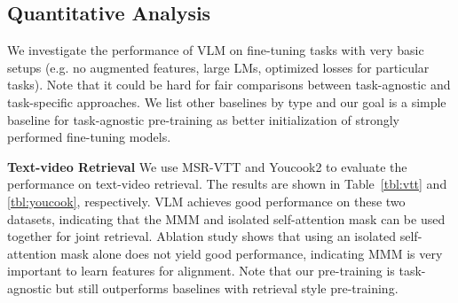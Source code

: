 \documentclass[11pt,a4paper]{article}
\begin{document}
\subsection{Quantitative Analysis}
We investigate the performance of VLM on fine-tuning tasks with very basic setups (e.g. no augmented features, large LMs, optimized losses for particular tasks).
Note that it could be hard for fair comparisons between task-agnostic and task-specific approaches. We list other baselines by type and our goal is a simple baseline for task-agnostic pre-training as better initialization of strongly performed fine-tuning models.

\noindent \textbf{Text-video Retrieval} We use MSR-VTT and Youcook2 to evaluate the performance on text-video retrieval.
The results are shown in Table~\ref{tbl:vtt} and \ref{tbl:youcook}, respectively.
VLM achieves good performance on these two datasets, indicating that the MMM and isolated self-attention mask can be used together for joint retrieval. Ablation study shows that using an isolated self-attention mask alone does not yield good performance, indicating MMM is very important to learn features for alignment. Note that our pre-training is task-agnostic but still outperforms baselines with retrieval style pre-training.

\begin{table}[t]
\centering
{}
\caption{Results of text-video retrieval on MSR-VTT dataset.}
\label{tbl:vtt}
\end{table}
\end{document}
